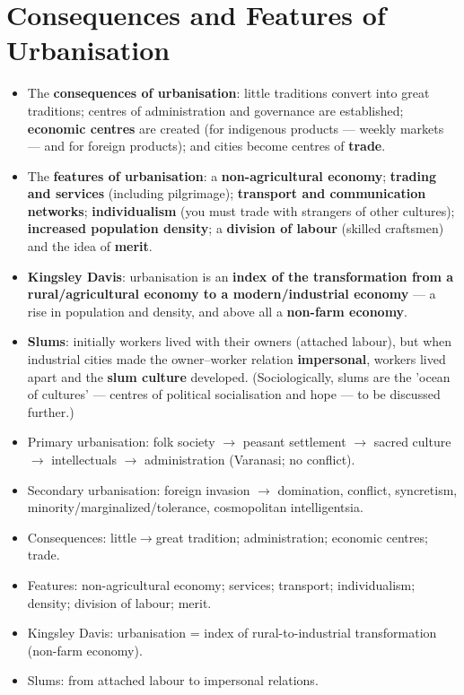 \section{Consequences and Features of Urbanisation}

\begin{KeyConcept}
\begin{itemize}
\item The \textbf{consequences of urbanisation}: little traditions convert into great traditions; centres of administration and governance are established; \textbf{economic centres} are created (for indigenous products --- weekly markets --- and for foreign products); and cities become centres of \textbf{trade}.
\item The \textbf{features of urbanisation}: a \textbf{non-agricultural economy}; \textbf{trading and services} (including pilgrimage); \textbf{transport and communication networks}; \textbf{individualism} (you must trade with strangers of other cultures); \textbf{increased population density}; a \textbf{division of labour} (skilled craftsmen) and the idea of \textbf{merit}.
\item \textbf{Kingsley Davis}: urbanisation is an \textbf{index of the transformation from a rural/agricultural economy to a modern/industrial economy} --- a rise in population and density, and above all a \textbf{non-farm economy}.
\item \textbf{Slums}: initially workers lived with their owners (attached labour), but when industrial cities made the owner--worker relation \textbf{impersonal}, workers lived apart and the \textbf{slum culture} developed. (Sociologically, slums are the 'ocean of cultures' --- centres of political socialisation and hope --- to be discussed further.)
\end{itemize}
\end{KeyConcept}

\begin{QuickRevision}
\begin{itemize}
\item Primary urbanisation: folk society $\rightarrow$ peasant settlement $\rightarrow$ sacred culture $\rightarrow$ intellectuals $\rightarrow$ administration (Varanasi; no conflict).
\item Secondary urbanisation: foreign invasion $\rightarrow$ domination, conflict, syncretism, minority/marginalized/tolerance, cosmopolitan intelligentsia.
\item Consequences: little$\rightarrow$great tradition; administration; economic centres; trade.
\item Features: non-agricultural economy; services; transport; individualism; density; division of labour; merit.
\item Kingsley Davis: urbanisation = index of rural-to-industrial transformation (non-farm economy).
\item Slums: from attached labour to impersonal relations.
\end{itemize}
\end{QuickRevision}

